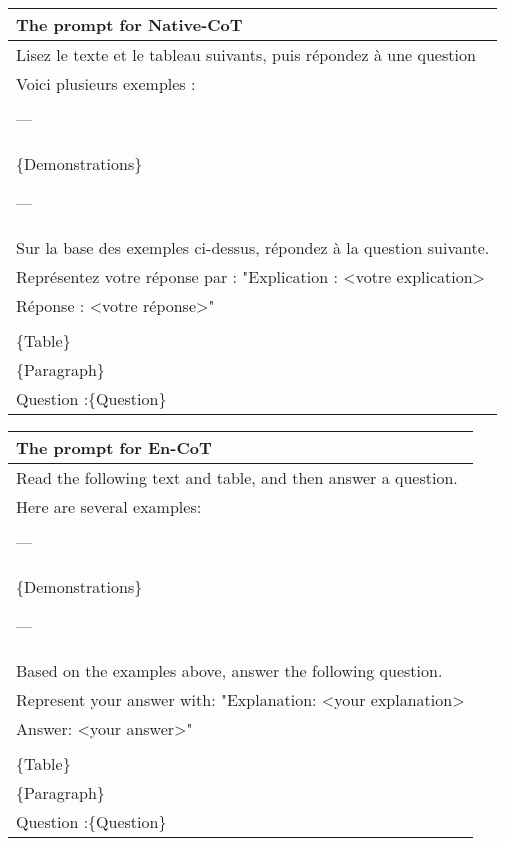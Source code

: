 \begin{tabular}{p{}}
\toprule
\textbf{The prompt for Native-CoT} \\
\midrule
Lisez le texte et le tableau suivants, puis répondez à une question\\
Voici plusieurs exemples :\\
\\
---\\

\{Demonstrations\}

---\\

Sur la base des exemples ci-dessus, répondez à la question suivante.\\
Représentez votre réponse par : "Explication : <votre explication>\\
Réponse : <votre réponse>"\\
\\
\{Table\}\\
\{Paragraph\}\\
Question :\{Question\}\\
\bottomrule
\end{tabular}

\begin{tabular}{p{}}
\toprule
\textbf{The prompt for En-CoT} \\
\midrule
Read the following text and table, and then answer a question.\\
Here are several examples:\\
\\
---\\

\{Demonstrations\}

---\\
Based on the examples above, answer the following question.\\
Represent your answer with: "Explanation: <your explanation>\\
Answer: <your answer>"\\
\\
\{Table\}\\
\{Paragraph\}\\
Question :\{Question\}\\
\bottomrule
\end{tabular}

